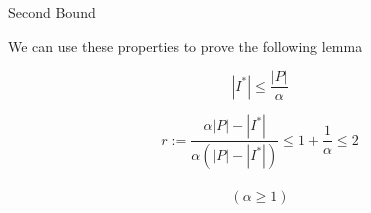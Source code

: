 \begin{frame}{Second Bound}

We can use these properties to prove the following lemma 

\begin{lemma}
$$ |I^*| \leq \frac{|P|}{\alpha} $$
\end{lemma}

\pause\begin{corollary}
$$
r 													:= 
\frac{\alpha |P| - |I^*|}{\alpha (|P| - |I^*|)} 	\leq 
1 + \frac{1}{\alpha} 								\leq 
2
$$
\\
\tiny
$$(\alpha \geq 1)$$
\end{corollary}


\end{frame}

